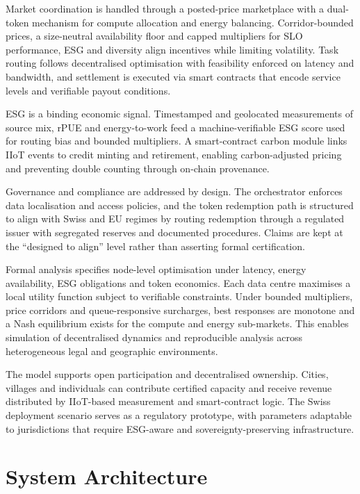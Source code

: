 \documentclass[oneside,10pt]{swissi}
\begin{document}
Market coordination is handled through a posted-price marketplace with a dual-token mechanism for compute allocation and energy balancing. Corridor-bounded prices, a size-neutral availability floor and capped multipliers for SLO performance, ESG and diversity align incentives while limiting volatility. Task routing follows decentralised optimisation with feasibility enforced on latency and bandwidth, and settlement is executed via smart contracts that encode service levels and verifiable payout conditions.

ESG is a binding economic signal. Timestamped and geolocated measurements of source mix, rPUE and energy-to-work feed a machine-verifiable ESG score used for routing bias and bounded multipliers. A smart-contract carbon module links IIoT events to credit minting and retirement, enabling carbon-adjusted pricing and preventing double counting through on-chain provenance.

Governance and compliance are addressed by design. The orchestrator enforces data localisation and access policies, and the token redemption path is structured to align with Swiss and EU regimes by routing redemption through a regulated issuer with segregated reserves and documented procedures. Claims are kept at the “designed to align” level rather than asserting formal certification.

Formal analysis specifies node-level optimisation under latency, energy availability, ESG obligations and token economics. Each data centre maximises a local utility function subject to verifiable constraints. Under bounded multipliers, price corridors and queue-responsive surcharges, best responses are monotone and a Nash equilibrium exists for the compute and energy sub-markets. This enables simulation of decentralised dynamics and reproducible analysis across heterogeneous legal and geographic environments.

The model supports open participation and decentralised ownership. Cities, villages and individuals can contribute certified capacity and receive revenue distributed by IIoT-based measurement and smart-contract logic. The Swiss deployment scenario serves as a regulatory prototype, with parameters adaptable to jurisdictions that require ESG-aware and sovereignty-preserving infrastructure.\\

\section{System Architecture}
\end{document}
